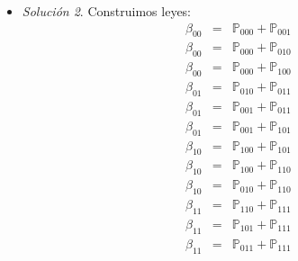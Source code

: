 \documentclass[notitlepage]{article}
\theoremstyle{definition}
\theoremstyle{remark}
\newtheorem*{sol}{Solución}
\newcommand{\pr}[1]{\mathbb{P}_{#1}}
\begin{document}
\begin{itemize}
\begin{sol}
			Utilizando \textit{Row Reduce} con Mathematica obtenemos que:
			\begin{equation}
			\begin{pmatrix}
			1 & 0 & 0 & -1 & 0 & -1 & -1 & -2 \\
			0 & 1 & 0 & 1 & 0 & 1 & 0 & 1 \\
			0 & 0 & 1 & 1 & 0 & 0 & 1 & 1 \\
			0 & 0 & 0 & 0 & 1 & 1 & 1 & 1 \\
			0 & 0 & 0 & 0 & 0 & 0 & 0 & 0 \\
			0 & 0 & 0 & 0 & 0 & 0 & 0 & 0
			\end{pmatrix} \nonumber
			\end{equation}
			
			Concluimos que existen 4 grados de libertad
		\end{sol}
		
		\item
		\begin{sol}
			Construimos leyes:
			\begin{eqnarray}
			\beta_{00}&=&\pr{000}+\pr{001} \nonumber
			\\\beta_{00}&=&\pr{000}+\pr{010}\nonumber
			\\\beta_{00}&=&\pr{000}+\pr{100}\nonumber
			\\\beta_{01}&=&\pr{010}+\pr{011}\nonumber
			\\\beta_{01}&=&\pr{001}+\pr{011}\nonumber
			\\\beta_{01}&=&\pr{001}+\pr{101}\nonumber
			\\\beta_{10}&=&\pr{100}+\pr{101}\nonumber
			\\\beta_{10}&=&\pr{100}+\pr{110}\nonumber
			\\\beta_{10}&=&\pr{010}+\pr{110}\nonumber
			\\\beta_{11}&=&\pr{110}+\pr{111}\nonumber
			\\\beta_{11}&=&\pr{101}+\pr{111}\nonumber
			\\\beta_{11}&=&\pr{011}+\pr{111}\nonumber
			\end{eqnarray}
			

\end{sol}
\end{itemize}
\end{document}
